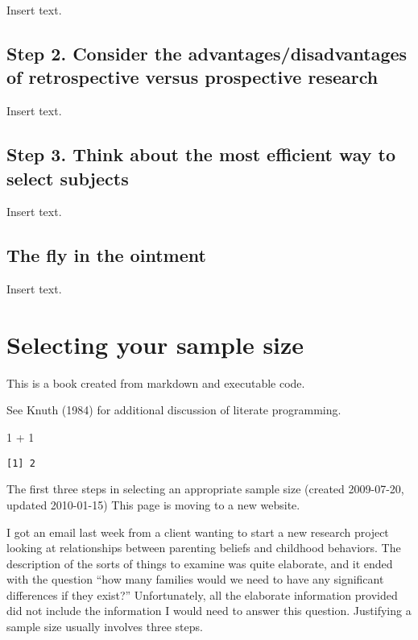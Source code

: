 \documentclass[
  letterpaper,
  DIV=11,
  numbers=noendperiod]{scrreprt}
\newenvironment{Shaded}{\begin{snugshade}}{\end{snugshade}}
\newcommand{\DecValTok}[1]{\textcolor[rgb]{0.68,0.00,0.00}{#1}}
\newcommand{\SpecialCharTok}[1]{\textcolor[rgb]{0.37,0.37,0.37}{#1}}
\begin{document}
Insert text.

\section{Step 2. Consider the advantages/disadvantages of retrospective
versus prospective
research}\label{step-2.-consider-the-advantagesdisadvantages-of-retrospective-versus-prospective-research}

Insert text.

\section{Step 3. Think about the most efficient way to select
subjects}\label{step-3.-think-about-the-most-efficient-way-to-select-subjects}

Insert text.

\section{The fly in the ointment}\label{the-fly-in-the-ointment-2}

Insert text.


\chapter{Selecting your sample size}\label{selecting-your-sample-size}

This is a book created from markdown and executable code.

See Knuth (1984) for additional discussion of literate programming.

\begin{Shaded}
\begin{Highlighting}[]
\DecValTok{1} \SpecialCharTok{+} \DecValTok{1}
\end{Highlighting}
\end{Shaded}

\begin{verbatim}
[1] 2
\end{verbatim}

The first three steps in selecting an appropriate sample size (created
2009-07-20, updated 2010-01-15) This page is moving to a new website.

I got an email last week from a client wanting to start a new research
project looking at relationships between parenting beliefs and childhood
behaviors. The description of the sorts of things to examine was quite
elaborate, and it ended with the question ``how many families would we
need to have any significant differences if they exist?'' Unfortunately,
all the elaborate information provided did not include the information I
would need to answer this question. Justifying a sample size usually
involves three steps.
\end{document}
